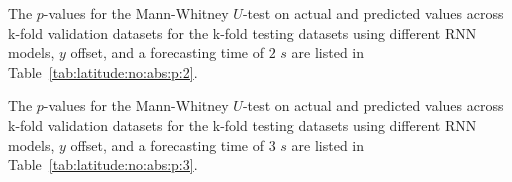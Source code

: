 The $p$-values for the Mann-Whitney $U$-test on actual and predicted values across k-fold validation datasets for the k-fold testing datasets using different RNN models, $y$ offset, and a forecasting time of $2$ $s$ are listed in Table~\ref{tab:latitude:no:abs:p:2}.

\begin{table}[!ht]
	\centering
	\caption{The $p$-values for the Mann-Whitney $U$-test on actual and predicted values across k-fold validation datasets for the k-fold testing datasets using different RNN models, $y$ offset, and a forecasting time of $2$ $s$.}
	\label{tab:latitude:no:abs:p:2}
\end{table}

The $p$-values for the Mann-Whitney $U$-test on actual and predicted values across k-fold validation datasets for the k-fold testing datasets using different RNN models, $y$ offset, and a forecasting time of $3$ $s$ are listed in Table~\ref{tab:latitude:no:abs:p:3}.

